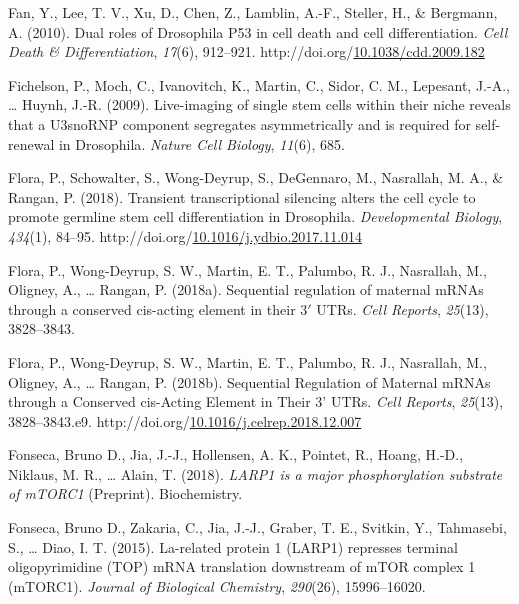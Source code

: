 \documentclass[12pt,oneside]{reedthesis}
\newlength{\cslhangindent}
\newenvironment{CSLReferences}[2] %
 {%
  \setlength{\parindent}{0pt}
  \ifodd #1 \everypar{\setlength{\hangindent}{\cslhangindent}}\ignorespaces\fi
  \ifnum #2 > 0
  \setlength{\parskip}{#2\baselineskip}
  \fi
 }%
 {}
\begin{document}
\begin{CSLReferences}{1}{0}
\leavevmode{}%
Fan, Y., Lee, T. V., Xu, D., Chen, Z., Lamblin, A.-F., Steller, H., \& Bergmann, A. (2010). Dual roles of {Drosophila} P53 in cell death and cell differentiation. \emph{Cell Death \& Differentiation}, \emph{17}(6), 912--921. http://doi.org/\href{https://doi.org/10.1038/cdd.2009.182}{10.1038/cdd.2009.182}

\leavevmode{}%
Fichelson, P., Moch, C., Ivanovitch, K., Martin, C., Sidor, C. M., Lepesant, J.-A., \ldots{} Huynh, J.-R. (2009). Live-imaging of single stem cells within their niche reveals that a {U3snoRNP} component segregates asymmetrically and is required for self-renewal in {Drosophila}. \emph{Nature Cell Biology}, \emph{11}(6), 685.

\leavevmode{}%
Flora, P., Schowalter, S., Wong-Deyrup, S., DeGennaro, M., Nasrallah, M. A., \& Rangan, P. (2018). Transient transcriptional silencing alters the cell cycle to promote germline stem cell differentiation in {Drosophila}. \emph{Developmental Biology}, \emph{434}(1), 84--95. http://doi.org/\href{https://doi.org/10.1016/j.ydbio.2017.11.014}{10.1016/j.ydbio.2017.11.014}

\leavevmode{}%
Flora, P., Wong-Deyrup, S. W., Martin, E. T., Palumbo, R. J., Nasrallah, M., Oligney, A., \ldots{} Rangan, P. (2018a). Sequential regulation of maternal {mRNAs} through a conserved cis-acting element in their 3{\({'}\)} {UTRs}. \emph{Cell Reports}, \emph{25}(13), 3828--3843.

\leavevmode{}%
Flora, P., Wong-Deyrup, S. W., Martin, E. T., Palumbo, R. J., Nasrallah, M., Oligney, A., \ldots{} Rangan, P. (2018b). Sequential {Regulation} of {Maternal mRNAs} through a {Conserved} cis-{Acting Element} in {Their} 3' {UTRs}. \emph{Cell Reports}, \emph{25}(13), 3828--3843.e9. http://doi.org/\href{https://doi.org/10.1016/j.celrep.2018.12.007}{10.1016/j.celrep.2018.12.007}

\leavevmode{}%
Fonseca, Bruno D., Jia, J.-J., Hollensen, A. K., Pointet, R., Hoang, H.-D., Niklaus, M. R., \ldots{} Alain, T. (2018). \emph{{LARP1} is a major phosphorylation substrate of {mTORC1}} (Preprint). {Biochemistry}.

\leavevmode{}%
Fonseca, Bruno D., Zakaria, C., Jia, J.-J., Graber, T. E., Svitkin, Y., Tahmasebi, S., \ldots{} Diao, I. T. (2015). La-related protein 1 ({LARP1}) represses terminal oligopyrimidine ({TOP}) {mRNA} translation downstream of {mTOR} complex 1 ({mTORC1}). \emph{Journal of Biological Chemistry}, \emph{290}(26), 15996--16020.


\end{CSLReferences}
\end{document}
